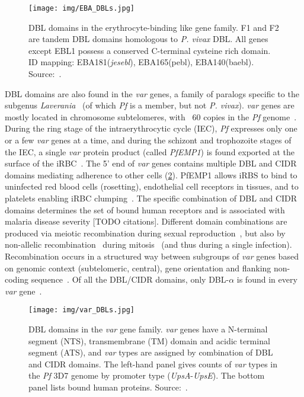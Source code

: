 \documentclass[12pt]{article}
\begin{document}
\begin{figure}
    \texttt{[image: img/EBA\_DBLs.jpg]}
    \caption{DBL domains in the erythrocyte-binding like gene family. F1 and F2 are tandem 
    DBL domains homologous to \textit{P. vivax} DBL. All genes except EBL1 possess a
    conserved C-terminal cysteine rich domain. ID mapping: EBA181(\textit{jesebl}),
    EBA165(pebl), EBA140(baebl). Source:~\cite{Adams2001}.
    }
    \label{fig:EBA_DBLs}
\end{figure}

DBL domains are also found in the \textit{var} genes, a family of paralogs specific to
the subgenus \textit{Laverania}~\cite{Otto2018,otto_evolutionary_2019} (of which
\textit{Pf} is a member, but not \textit{P. vivax}).  \textit{var} genes are mostly
located in chromosome subtelomeres, with ~60 copies in the \textit{Pf}
genome~\cite{Su1995,Gardner2002}. During the ring stage of the intraerythrocytic 
cycle (IEC), \textit{Pf} expresses only one or a few \textit{var} genes at a time, and during
the schizont and trophozoite stages of the IEC, a single \textit{var} protein
product (called \textit{PfEMP1}) is found exported at the surface of the
iRBC~\cite{Chen1998}. The 5' end of \textit{var} genes contains multiple DBL and CIDR
domains mediating adherence to other cells (\cref{fig:var_DBLs}). PfEMP1 allows iRBS to
bind to uninfected red blood cells (rosetting), endothelial cell receptors in tissues,
and to platelets enabling iRBC clumping~\cite{Miller2002}. The specific combination of
DBL and CIDR domains determines the set of bound human receptors and is associated with
malaria disease severity [TODO citations].  Different domain combinations are produced
via meiotic recombination during sexual reproduction~\cite{Su1999}, but also by
non-allelic recombination~\cite{FreitasJunior2000} during mitosis~\cite{Duffy2009} (and
thus during a single infection). Recombination occurs in a structured way between
subgroups of \textit{var} genes based on genomic context (subtelomeric, central), gene
orientation and flanking non-coding sequence~\cite{Kraemer2003}.  Of all the DBL/CIDR
domains, only DBL-$\alpha$ is found in every \textit{var} gene~\cite{Smith2000}.

\begin{figure}
    \texttt{[image: img/var\_DBLs.jpg]}
    \caption{DBL domains in the \textit{var} gene family. 
    \textit{var} genes have a N-terminal segment (NTS), transmembrane (TM) domain and
    acidic terminal segment (ATS),
    and \textit{var} types are assigned by combination of DBL and CIDR domains. The left-hand
    panel gives counts of \textit{var} types in the \textit{Pf} 3D7 genome by
    promoter type (\textit{UpsA}-\textit{UpsE}). 
    The bottom panel lists bound human proteins.  Source:~\cite{Kraemer2006}.
    }
    \label{fig:var_DBLs}
\end{figure}
\end{document}
